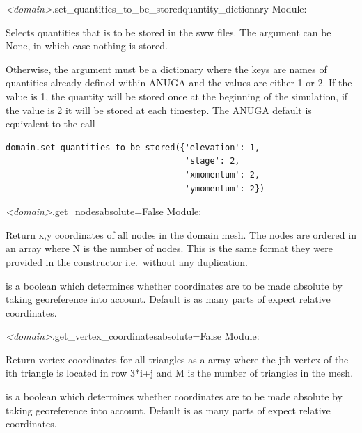 \documentclass{manual}
\begin{document}
\begin{methoddesc}{\emph{<domain>}.set_quantities_to_be_stored}{quantity_dictionary}
Module: 

Selects quantities that is to be stored in the sww files.
The argument can be None, in which case nothing is stored.

Otherwise, the argument must be a dictionary where the keys are names of quantities 
already defined within ANUGA and the values are either 1 or 2. If the value is 1, the quantity 
will be stored once at the beginning of the simulation, if the value is 2 it will be stored 
at each timestep. The ANUGA default is equivalent to the call
\begin{verbatim} 
domain.set_quantities_to_be_stored({'elevation': 1,
                                    'stage': 2, 
                                    'xmomentum': 2, 
                                    'ymomentum': 2})
\end{verbatim} 
\end{methoddesc}


\begin{methoddesc}{\emph{<domain>}.get_nodes}{absolute=False}
Module: 

Return x,y coordinates of all nodes in the domain mesh.  The nodes are ordered
in an  array where N is the number of nodes.  This is the same format
they were provided in the constructor i.e.\ without any duplication.

 is a boolean which determines whether coordinates
are to be made absolute by taking georeference into account.
Default is  as many parts of \anuga expect relative coordinates.
\end{methoddesc}

\begin{methoddesc}{\emph{<domain>}.get_vertex_coordinates}{absolute=False}
Module: 

\label{pg:get vertex coordinates}
Return vertex coordinates for all triangles as a  array
where the jth vertex of the ith triangle is located in row 3*i+j and
M is the number of triangles in the mesh.

 is a boolean which determines whether coordinates
are to be made absolute by taking georeference into account.
Default is  as many parts of \anuga expect relative coordinates.
\end{methoddesc}
\end{document}
